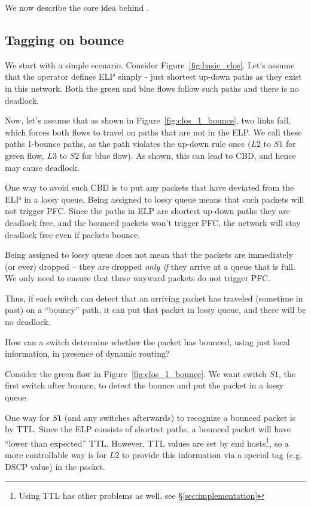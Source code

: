 We now describe the core idea behind \sysname{}.

\subsection{Tagging on bounce}
\label{subsec:tag}

We start with a simple scenario. Consider Figure~\ref{fig:basic_clos}. Let's
assume that the operator defines ELP simply - just shortest up-down paths as
they exist in this network.  Both the green and blue flows follow such paths and
there is no deadlock.

Now, let's assume that as shown in Figure~\ref{fig:clos_1_bounce}, two links
fail, which forces both flows to travel on paths that are not in the ELP. We
call these paths 1-bounce paths, as the path violates the up-down rule once
($L2$ to $S1$ for green flow, $L3$ to $S2$ for blue flow). As shown, this can
lead to CBD, and hence may cause deadlock.

One way to avoid such CBD is to put any packets that have deviated from the ELP
 in a lossy queue.  Being assigned to lossy queue means that such packets
will not trigger PFC. Since the paths in ELP are shortest up-down paths they are
deadlock free, and the bounced packets won't trigger PFC, the network will stay
deadlock free even if packets bounce.

Being assigned to lossy queue does not mean that the packets are
immediately (or ever) dropped -- they are dropped {\em only if} they arrive at a
queue that is full. We only need to ensure that these wayward packets do not trigger
PFC.

Thus, if each switch can detect that an arriving packet has traveled (sometime
in past) on a ``bouncy'' path, it can put that packet in lossy queue, and there
will be no deadlock.

How can a switch determine whether the packet has bounced, using just local
information, in presence of dynamic routing?

Consider the green flow in Figure~\ref{fig:clos_1_bounce}.  We want switch $S1$,
the first switch after bounce, to detect the bounce and put the packet in a
lossy queue.

One way for $S1$ (and any switches afterwards) to recognize a bounced packet
is by TTL. Since the ELP consists of shortest paths, a bounced packet will have
``lower than expected'' TTL. However, TTL values are set by end
hosts\footnote{Using TTL has other problems as well, see \S\ref{sec:implementation}}, so a
more controllable way is for $L2$ to provide this information via a
special tag (e.g. DSCP value) in the packet.

